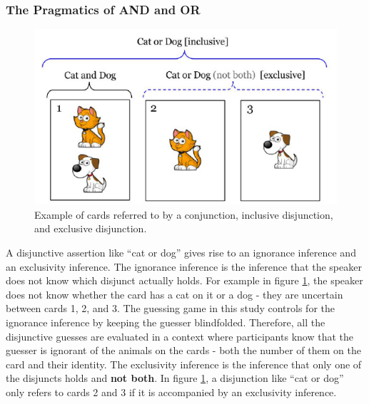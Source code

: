 \documentclass[oneside]{report}
\theoremstyle{definition}
\theoremstyle{definition}
\theoremstyle{definition}
\theoremstyle{remark}
\begin{document}
\subsubsection{The Pragmatics of AND and OR}\label{implicature}
\begin{figure}[t]

{\centering \includegraphics{figs/exclusivity-1} 

}

\caption{Example of cards referred to by a conjunction, inclusive disjunction, and exclusive disjunction.}\label{fig:exclusivity}
\end{figure}
A disjunctive assertion like ``cat or dog'' gives rise to an ignorance
inference and an exclusivity inference. The ignorance inference is the
inference that the speaker does not know which disjunct actually holds.
For example in figure \ref{fig:exclusivity}, the speaker does not know
whether the card has a cat on it or a dog - they are uncertain between
cards 1, 2, and 3. The guessing game in this study controls for the
ignorance inference by keeping the guesser blindfolded. Therefore, all
the disjunctive guesses are evaluated in a context where participants
know that the guesser is ignorant of the animals on the cards - both the
number of them on the card and their identity. The exclusivity inference
is the inference that only one of the disjuncts holds and \textbf{not
both}. In figure \ref{fig:exclusivity}, a disjunction like ``cat or
dog'' only refers to cards 2 and 3 if it is accompanied by an
exclusivity inference.
\end{document}

